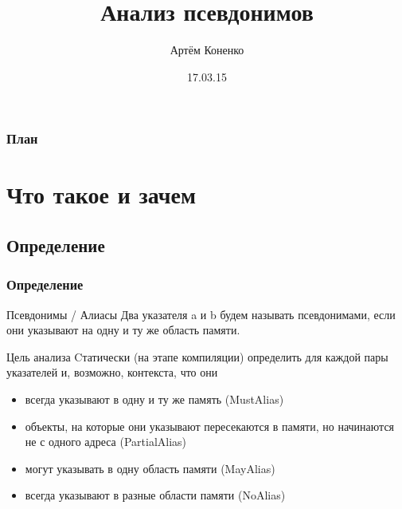 \documentclass[utf8,russian]{beamer}
\title[Анализ псевдонимов]{Анализ псевдонимов} %
\author{Артём Коненко} %
\date{17.03.15} %
\begin{document}
\begin{frame}
\titlepage %
\end{frame}

\begin{frame}
\frametitle{План} %
\tableofcontents %
\end{frame}


\section{Что такое и зачем}

\subsection{Определение}

\begin{frame}
\frametitle{Определение}

\begin{block}{Псевдонимы / Алиасы}
Два указателя a и b будем называть псевдонимами, если они указывают на одну и ту же область памяти.
\end{block}

\begin{block}{Цель анализа}
Cтатически (на этапе компиляции) определить для каждой пары указателей и, возможно, контекста, что они
\begin{itemize}
\item всегда указывают в одну и ту же память (MustAlias)
\item объекты, на которые они указывают пересекаются в памяти, но начинаются не с одного адреса (PartialAlias)
\item могут указывать в одну область памяти (MayAlias)
\item всегда указывают в разные области памяти (NoAlias)
\end{itemize}
\end{block}

\end{frame}
\end{document}
